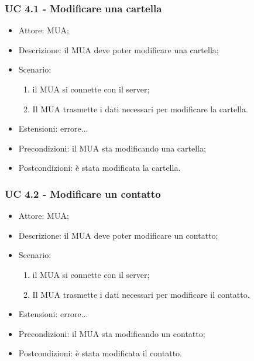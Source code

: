     \subsubsection{UC 4.1 - Modificare una cartella} \label{sec: UC 4.1}
    \begin{itemize}
        \item Attore: MUA;
        \item Descrizione: il MUA deve poter modificare una cartella;
        \item Scenario:
        \begin{enumerate}
        \item il MUA si connette con il server;
        \item Il MUA trasmette i dati necessari per modificare la cartella.
        \end{enumerate}
        \item Estensioni: errore...
        \item Precondizioni: il MUA sta modificando una cartella;
        \item Postcondizioni: è stata modificata la cartella.
    \end{itemize}

    \subsubsection{UC 4.2 - Modificare un contatto} \label{sec: UC 4.2}
    \begin{itemize}
        \item Attore: MUA;
        \item Descrizione: il MUA deve poter modificare un contatto;
        \item Scenario:
        \begin{enumerate}
        \item il MUA si connette con il server;
        \item Il MUA trasmette i dati necessari per modificare il contatto.
        \end{enumerate}
        \item Estensioni: errore...
        \item Precondizioni: il MUA sta modificando un contatto;
        \item Postcondizioni: è stata modificata il contatto.
    \end{itemize}

